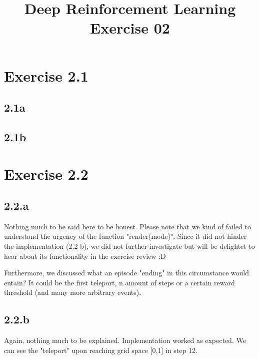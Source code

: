 \documentclass{article} %
\begin{document}
	
	\title{Deep Reinforcement Learning Exercise 02}
	\maketitle
	
	\section{Exercise 2.1}
	\subsection{2.1a}
	
	\subsection{2.1b}
	
	
	
	\section{Exercise 2.2}
	\subsection{2.2.a}
	Nothing much to be said here to be honest. Please note that we kind of failed to understand the urgency of the function "render(mode)". Since it did not hinder the implementation (2.2 b), we did not further investigate but will be delightet to hear about its functionality in the exercise review :D 
	
	Furthermore, we discussed what an episode "ending" in this circumstance would entain? It could be the first teleport, n amount of steps or a certain reward threshold (and many more arbitrary events).
	
	\subsection{2.2.b}
	Again, nothing much to be explained. Implementation worked as expected. We can see the "teleport" upon reaching grid space [0,1] in step 12. 
	
\end{document}

